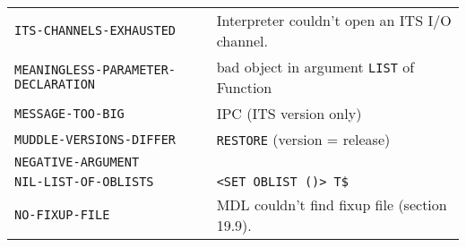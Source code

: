 \documentclass[a4paper]{scrbook}
\begin{document}
\begin{longtable}[]{@{}ll@{}}
\begin{minipage}[t]{0.58\columnwidth}
\texttt{ITS-CHANNELS-EXHAUSTED}\strut
\end{minipage} & \begin{minipage}[t]{0.36\columnwidth}\raggedright\strut
Interpreter couldn't open an ITS I/O channel.\strut
\end{minipage}\tabularnewline
\begin{minipage}[t]{0.58\columnwidth}\raggedright\strut
\texttt{MEANINGLESS-PARAMETER-DECLARATION}\strut
\end{minipage} & \begin{minipage}[t]{0.36\columnwidth}\raggedright\strut
bad object in argument \texttt{LIST} of Function\strut
\end{minipage}\tabularnewline
\begin{minipage}[t]{0.58\columnwidth}\raggedright\strut
\texttt{MESSAGE-TOO-BIG}\strut
\end{minipage} & \begin{minipage}[t]{0.36\columnwidth}\raggedright\strut
IPC (ITS version only)\strut
\end{minipage}\tabularnewline
\begin{minipage}[t]{0.58\columnwidth}\raggedright\strut
\texttt{MUDDLE-VERSIONS-DIFFER}\strut
\end{minipage} & \begin{minipage}[t]{0.36\columnwidth}\raggedright\strut
\texttt{RESTORE} (version = release)\strut
\end{minipage}\tabularnewline
\begin{minipage}[t]{0.58\columnwidth}\raggedright\strut
\texttt{NEGATIVE-ARGUMENT}\strut
\end{minipage} & \begin{minipage}[t]{0.36\columnwidth}\raggedright\strut
\strut
\end{minipage}\tabularnewline
\begin{minipage}[t]{0.58\columnwidth}\raggedright\strut
\texttt{NIL-LIST-OF-OBLISTS}\strut
\end{minipage} & \begin{minipage}[t]{0.36\columnwidth}\raggedright\strut
\texttt{\textless{}SET\ OBLIST\ \textquotesingle{}()\textgreater{}\ T\$}\strut
\end{minipage}\tabularnewline
\begin{minipage}[t]{0.58\columnwidth}\raggedright\strut
\texttt{NO-FIXUP-FILE}\strut
\end{minipage} & \begin{minipage}[t]{0.36\columnwidth}\raggedright\strut
MDL couldn't find fixup file (section 19.9).\strut

\end{minipage}
\end{longtable}
\end{document}
